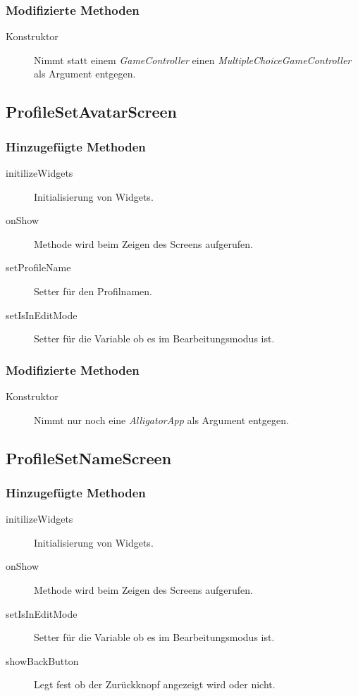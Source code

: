 \subsubsection{Modifizierte Methoden}
\begin{description}
\item[Konstruktor]
Nimmt statt einem \emph{GameController} einen \emph{MultipleChoiceGameController} als Argument entgegen.

\end{description}



\subsection{ProfileSetAvatarScreen}

\subsubsection{Hinzugefügte Methoden}
\begin{description}
\item[initilizeWidgets]
Initialisierung von Widgets.
\item[onShow]
Methode wird beim Zeigen des Screens aufgerufen.
\item[setProfileName]
Setter für den Profilnamen.
\item[setIsInEditMode]
Setter für die Variable ob es im Bearbeitungsmodus ist.
\end{description}

\subsubsection{Modifizierte Methoden}
\begin{description}
\item[Konstruktor]
Nimmt nur noch eine \emph{AlligatorApp} als Argument entgegen.

\end{description}



\subsection{ProfileSetNameScreen}

\subsubsection{Hinzugefügte Methoden}
\begin{description}
\item[initilizeWidgets]
Initialisierung von Widgets.
\item[onShow]
Methode wird beim Zeigen des Screens aufgerufen.
\item[setIsInEditMode]
Setter für die Variable ob es im Bearbeitungsmodus ist.
\item[showBackButton]
Legt fest ob der Zurückknopf angezeigt wird oder nicht.
\end{description}


